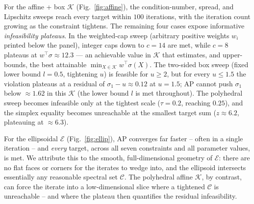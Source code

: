 \documentclass[journal]{IEEEtran}
\newcommand{\sgm}{\sigma}
\newcommand{\Kset}{\mathcal{K}}
\newcommand{\Cset}{\mathcal{C}}
\newcommand{\Ellipsoid}{\mathcal{E}}
\begin{document}
For the affine + box $\Kset$ (Fig.~\ref{fig:affine}), the
condition-number, spread, and Lipschitz sweeps reach every target within
$100$ iterations, with the iteration count growing as the constraint
tightens. The remaining four cases expose informative
\emph{infeasibility plateaus}. In the weighted-cap sweep (arbitrary
positive weights $w_i$ printed below the panel), integer caps down to
$c=14$ are met, while $c=8$ plateaus at $w^\top\sgm \approx 12.3$ --- an
achievable value in $\Kset$ that estimates, and upper-bounds, the best
attainable $\min_{X\in\Kset} w^\top\sgm(X)$. The two-sided
box sweep (fixed lower bound $l=0.5$, tightening $u$) is feasible for
$u \ge 2$, but for every $u \le 1.5$ the violation plateaus at a residual
of $\sgm_1 - u \approx 0.12$ at $u=1.5$; AP cannot push $\sgm_1$
below $\approx 1.62$ in this $\Kset$ (the lower bound $l$ is met
throughout). The
polyhedral sweep becomes infeasible only at the tightest scale
($\tau=0.2$, reaching $0.25$), and the simplex equality becomes
unreachable at the smallest target sum ($z\approx 6.2$, plateauing at
$\approx 6.3$).

For the ellipsoidal $\Ellipsoid$ (Fig.~\ref{fig:ellip}), AP converges
far faster -- often in a single iteration -- and \emph{every} target,
across all seven constraints and all parameter values, is met. We
attribute this to the smooth, full-dimensional geometry of
$\Ellipsoid$: there are no flat faces or corners for the iterates to
wedge into, and the ellipsoid intersects essentially any reasonable
spectral set $\Cset$. The polyhedral affine $\Kset$, by contrast, can
force the iterate into a low-dimensional slice where a tightened $\Cset$
is unreachable -- and where the plateau then quantifies the residual
infeasibility.
\end{document}
